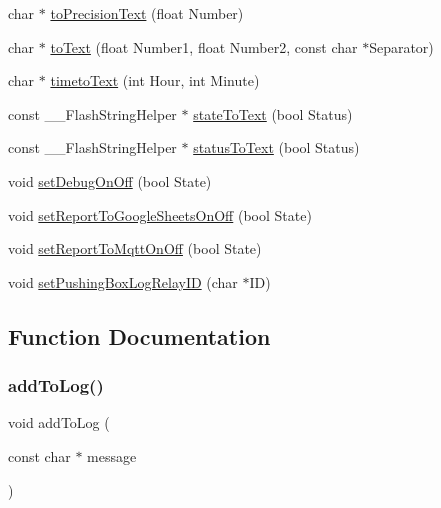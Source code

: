 \begin{DoxyCompactItemize}
char $\ast$ \mbox{\hyperlink{_logging_8ino_a4e83915d00c402e1c191e4d344f23e30}{to\+Precision\+Text}} (float Number)
\item 
char $\ast$ \mbox{\hyperlink{_logging_8ino_a83d30b216f8ed6672a7b08515c9ad5d8}{to\+Text}} (float Number1, float Number2, const char $\ast$Separator)
\item 
char $\ast$ \mbox{\hyperlink{_logging_8ino_a6bf81c454bda68dae49607f33a3f8e1d}{timeto\+Text}} (int Hour, int Minute)
\item 
const \+\_\+\+\_\+\+Flash\+String\+Helper $\ast$ \mbox{\hyperlink{_logging_8ino_ade7f2afded867617cdacc2587cc31305}{state\+To\+Text}} (bool Status)
\item 
const \+\_\+\+\_\+\+Flash\+String\+Helper $\ast$ \mbox{\hyperlink{_logging_8ino_a013895268de2e12a0aa1a8e88ff67b61}{status\+To\+Text}} (bool Status)
\item 
void \mbox{\hyperlink{_logging_8ino_aabf3a969519c0ffa581d20e8ccf4eff3}{set\+Debug\+On\+Off}} (bool State)
\item 
void \mbox{\hyperlink{_logging_8ino_ad5732ad0ac20950bf20e87b219c679c5}{set\+Report\+To\+Google\+Sheets\+On\+Off}} (bool State)
\item 
void \mbox{\hyperlink{_logging_8ino_a116482fed98acd57e3758b7e5a8a0d1c}{set\+Report\+To\+Mqtt\+On\+Off}} (bool State)
\item 
void \mbox{\hyperlink{_logging_8ino_a03f4d69dc6bf7b5c9fd74920ade37f30}{set\+Pushing\+Box\+Log\+Relay\+ID}} (char $\ast$ID)
\end{DoxyCompactItemize}


\subsection{Function Documentation}
\mbox{\label{_logging_8ino_adeabc8820c47e5de835e1b54cc277645}} 
\subsubsection{\texorpdfstring{addToLog()}{addToLog()}\hspace{0.1cm}{\footnotesize\ttfamily [1/2]}}
{\footnotesize\ttfamily void add\+To\+Log (\begin{DoxyParamCaption}\item[{const char $\ast$}]{message }\end{DoxyParamCaption})}



